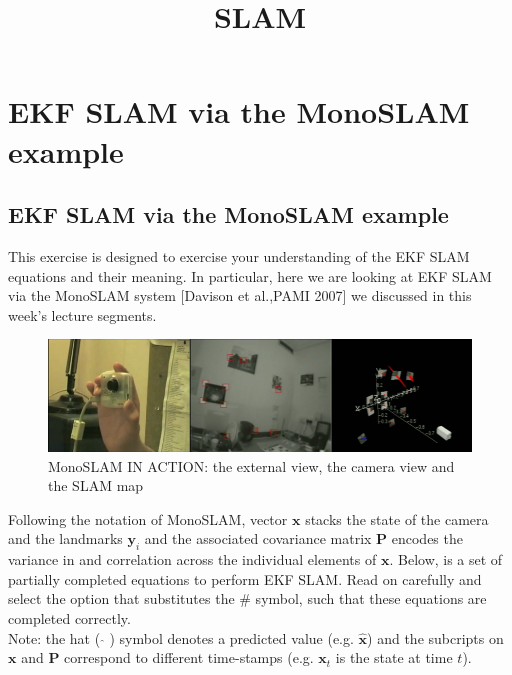 \documentclass[12pt]{article}
\renewcommand{\vec}[1]{\mathbf{#1}}
\begin{document}
 
 
\title{SLAM }
\date{\vspace{-20mm}}
\maketitle

\section*{EKF SLAM via the MonoSLAM example} 

\subsection*{EKF SLAM via the MonoSLAM example}

This exercise is designed to exercise your understanding of the EKF SLAM equations and their meaning. In particular, here we are looking at EKF SLAM via the MonoSLAM system [Davison et al.,PAMI 2007] we discussed in this week's lecture segments. \\

\begin{figure}[h]
	\centering
	\includegraphics[width=0.8\linewidth]{monoslam_snapshot}
	\caption{MonoSLAM IN ACTION: the external view, the camera view and the SLAM map}
\end{figure}

\noindent Following the notation of MonoSLAM, vector $\vec{x}$ stacks the state of the camera and the landmarks $\vec{y}_i$ and the associated covariance matrix $\mathbf{P}$ encodes the variance in and correlation across the individual elements of $\vec{x}$. Below, is a set of partially completed equations to perform EKF SLAM. Read on carefully and select the option that substitutes the \# symbol, such that these equations are completed correctly. \\

\noindent Note: the hat ( $\hat{}$ ) symbol denotes a predicted value (e.g. $\hat{\vec{x}}$) and the subcripts on $\vec{x}$ and $\mathbf{P}$ correspond to different time-stamps (e.g. $\vec{x}_t$ is the state at time $t$). \\
\end{document}
